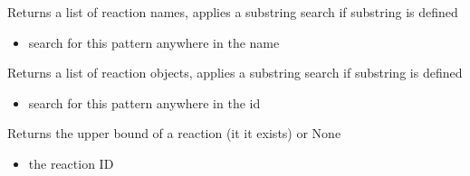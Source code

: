 \documentclass[letterpaper,10pt,english]{sphinxmanual}
\begin{document}
\begin{fulllineitems}
\begin{fulllineitems}
\begin{itemize}
\end{itemize}

\end{fulllineitems}


\begin{fulllineitems}
\label{\detokenize{modules_doc:cbmpy.CBModel.Model.getReactionNames}}
\pysigstartsignatures
{}
\pysigstopsignatures
\sphinxAtStartPar
Returns a list of reaction names, applies a substring search if substring is defined
\begin{itemize}
\item {} 
\sphinxAtStartPar
{} search for this pattern anywhere in the name

\end{itemize}

\end{fulllineitems}


\begin{fulllineitems}
\label{\detokenize{modules_doc:cbmpy.CBModel.Model.getReactionObjects}}
\pysigstartsignatures
{}
\pysigstopsignatures
\sphinxAtStartPar
Returns a list of reaction objects, applies a substring search if substring is defined
\begin{itemize}
\item {} 
\sphinxAtStartPar
{} search for this pattern anywhere in the id

\end{itemize}

\end{fulllineitems}


\begin{fulllineitems}
\label{\detokenize{modules_doc:cbmpy.CBModel.Model.getReactionUpperBound}}
\pysigstartsignatures
{}
\pysigstopsignatures
\sphinxAtStartPar
Returns the upper bound of a reaction (it it exists) or None
\begin{itemize}
\item {} 
\sphinxAtStartPar
{} the reaction ID


\end{itemize}
\end{fulllineitems}
\end{fulllineitems}
\end{document}
